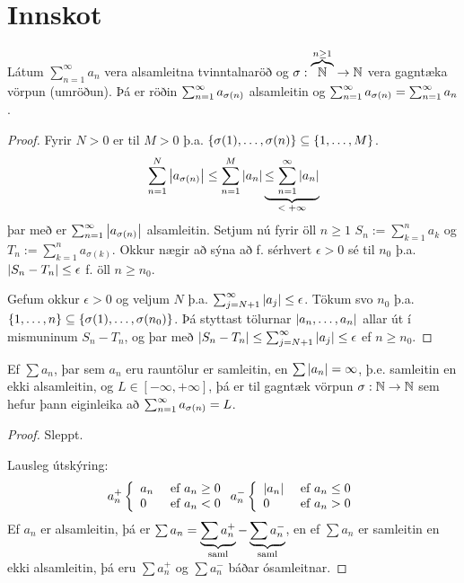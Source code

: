 \documentclass[12pt]{book} \usepackage[utf8]{inputenc}
\begin{document}
\section*{Innskot}

\begin{setn}
  Látum $\sum_{n=1}^{\infty}a_n$ vera alsamleitna tvinntalnaröð og
  $\sigma: \overbrace{\mathbb{N}}^{n \geq 1} \to \mathbb{N}$ vera gagntæka vörpun
  (umröðun). Þá er röðin $\sum_{n = {1}}^{\infty} a_{\sigma(n)}$ alsamleitin og
  $\sum_{n = {1}}^{\infty} a_{\sigma(n)} = \sum_{n = 1}^{\infty} a_n$.
\end{setn}
\begin{proof}
  Fyrir $N > 0$ er til $M > 0$ þ.a.
  $\{\sigma(1), \dotsc, \sigma(n)\} \subseteq \{1, \dotsc, M\}$.
  \[\sum_{n=1}^{N} \left|a_{\sigma(n)}\right|
  \leq \sum_{n = 1}^M \left|a_n\right| \underbrace{\leq \sum_{n = {1}}^{\infty}
    \left|a_n\right|}_{\text{$< +\infty$}}
  \]
  þar með er $\sum_{n = 1}^{\infty} \left|a_{\sigma(n)}\right|$ alsamleitin.  Setjum nú
  fyrir öll $n \geq 1$ $S_n := \sum_{k=1}^n a_k$ og
  $T_n := \sum_{k=1}^n a_{\sigma(k)}$.  Okkur nægir að sýna að
  f. sérhvert $\epsilon > 0$ sé til $n_0$ þ.a.
  $\left|S_n - T_n\right| \leq \epsilon$ f. öll $n \geq n_0$.

  Gefum okkur $\epsilon > 0$ og veljum $N$ þ.a.
  $\sum_{j = N+1}^{\infty} \left|a_j\right| \leq \epsilon$. Tökum svo $n_0$
  þ.a.
  $ \{1, \dotsc, n\} \subseteq \{\sigma(1), \dotsc,
    \sigma(n_0)\}$.
  Þá styttast tölurnar $\left|a_n, \dotsc, a_n\right|$ allar út í mismuninum
  $S_n - T_n$, og þar með
  $\left|S_n - T_n\right| \leq \sum_{j = N+1}^{\infty} \left|a_j\right| \leq
  \epsilon$ ef $n \geq n_0$.
\end{proof}

\begin{setn}
  Ef $\sum a_n$, þar sem $a_n$ eru rauntölur er samleitin, en
  $\sum \left|a_n\right| = \infty$, þ.e.  samleitin en ekki alsamleitin, og
  $L \in [-\infty, +\infty]$, þá er til gagntæk vörpun
  $\sigma: \mathbb{N} \to \mathbb{N}$ sem hefur þann eiginleika að
  $\sum_{n = 1}^{\infty} a_{\sigma(n)} = L$.
\end{setn}
\begin{proof} Sleppt.

  Lausleg útskýring:
  \[a_n^+ \left\{ \begin{array}{l l} a_n & \text{ ef } a_n \geq 0 \\ 0 & \text{ ef } a_n < 0 \end{array} \right.
  a_n^- \left\{ \begin{array}{l l} \left|a_n\right| & \text{ ef } a_n \leq 0 \\ 0 & \text{ ef } a_n > 0
  \end{array} \right.
  \]
  Ef $a_n$ er alsamleitin, þá er
  $\sum a_n = \underbrace{\sum a_n^+}_{\text{saml}} - \underbrace{\sum a_n^-}_{\text{saml}}$, en ef
  $\sum a_n$ er samleitin en ekki alsamleitin, þá eru $\sum a_n^+$ og
  $\sum a_n^-$ báðar ósamleitnar.

\end{proof}
\end{document}
